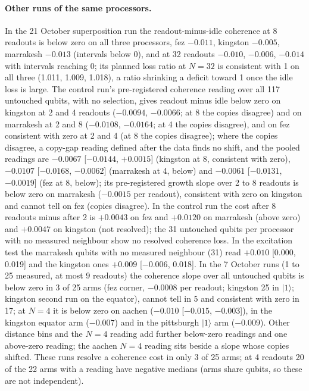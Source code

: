 \documentclass[reprint,amsmath,amssymb,aps,superscriptaddress,nofootinbib]{revtex4-2}
\begin{document}
\paragraph*{Other runs of the same processors.} In the 21 October superposition run the readout-minus-idle coherence at 8 readouts is below zero on all three processors, fez $-0.011$, kingston $-0.005$, marrakesh $-0.013$ (intervals below 0), and at 32 readouts $-0.010$, $-0.006$, $-0.014$ with intervals reaching 0; its planned loss ratio at $N=32$ is consistent with 1 on all three (1.011, 1.009, 1.018), a ratio shrinking a deficit toward 1 once the idle loss is large. The control run's pre-registered coherence reading over all 117 untouched qubits, with no selection, gives readout minus idle below zero on kingston at 2 and 4 readouts ($-0.0094$, $-0.0066$; at 8 the copies disagree) and on marrakesh at 2 and 8 ($-0.0108$, $-0.0164$; at 4 the copies disagree), and on fez consistent with zero at 2 and 4 (at 8 the copies disagree); where the copies disagree, a copy-gap reading defined after the data finds no shift, and the pooled readings are $-0.0067$ [$-0.0144$, $+0.0015$] (kingston at 8, consistent with zero), $-0.0107$ [$-0.0168$, $-0.0062$] (marrakesh at 4, below) and $-0.0061$ [$-0.0131$, $-0.0019$] (fez at 8, below); its pre-registered growth slope over 2 to 8 readouts is below zero on marrakesh ($-0.0015$ per readout), consistent with zero on kingston and cannot tell on fez (copies disagree). In the control run the cost after 8 readouts minus after 2 is $+0.0043$ on fez and $+0.0120$ on marrakesh (above zero) and $+0.0047$ on kingston (not resolved); the 31 untouched qubits per processor with no measured neighbour show no resolved coherence loss. In the excitation test the marrakesh qubits with no measured neighbour (31) read $+0.010$ [0.000, 0.019] and the kingston ones $+0.009$ [$-0.006$, 0.018]. In the 7 October runs (1 to 25 measured, at most 9 readouts) the coherence slope over all untouched qubits is below zero in 3 of 25 arms (fez corner, $-0.0008$ per readout; kingston 25 in $|1\rangle$; kingston second run on the equator), cannot tell in 5 and consistent with zero in 17; at $N=4$ it is below zero on aachen ($-0.010$ [$-0.015$, $-0.003$]), in the kingston equator arm ($-0.007$) and in the pittsburgh $|1\rangle$ arm ($-0.009$). Other distance bins and the $N=4$ reading add further below-zero readings and one above-zero reading; the aachen $N=4$ reading sits beside a slope whose copies shifted. These runs resolve a coherence cost in only 3 of 25 arms; at 4 readouts 20 of the 22 arms with a reading have negative medians (arms share qubits, so these are not independent).
\end{document}

